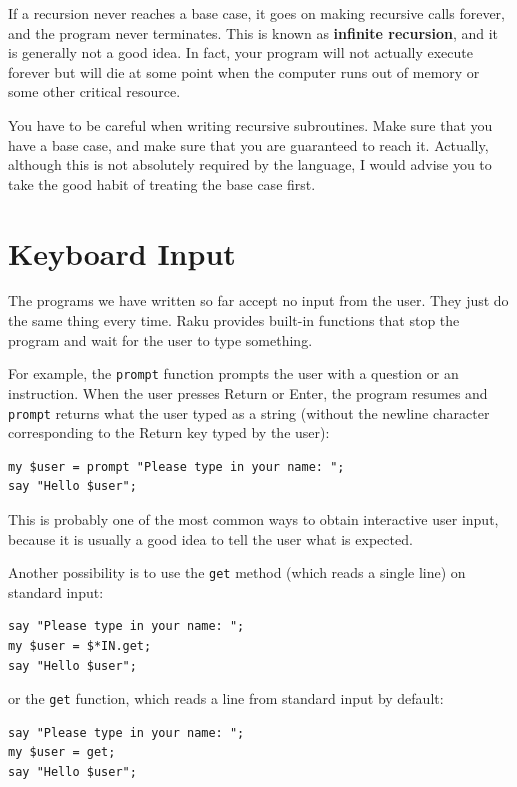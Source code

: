 If a recursion never reaches a base case, it goes on making
recursive calls forever, and the program never terminates.  This is
known as {\bf infinite recursion}, and it is generally not
a good idea. In fact, your program will not actually execute 
forever but will die at some point when the computer runs out of 
memory or some other critical resource.

You have to be careful when writing recursive subroutines. 
Make sure that you have a base case, and make sure that 
you are guaranteed to reach it. Actually, although this is not 
absolutely required by the language, I would advise you to 
take the good habit of treating the base case first.


\section{Keyboard Input}

The programs we have written so far accept no input from 
the user. They just do the same thing every time. Raku 
provides built-in functions that stop the program and
wait for the user to type something. 

For example, the {\tt prompt} function prompts the user with 
a question or an instruction. When the user presses 
{\sf Return} or {\sf Enter}, the program resumes and 
\verb"prompt" returns what the user typed as a string 
(without the newline character corresponding to the 
{\sf Return} key typed by the user):

\begin{verbatim}
my $user = prompt "Please type in your name: ";
say "Hello $user";
\end{verbatim}
%

This is probably one of the most common ways to obtain 
interactive user input, because it is usually a good idea 
to tell the user what is expected.

Another possibility is to use the {\tt get} method (which
 reads a single line) on standard input:

\begin{verbatim}
say "Please type in your name: ";
my $user = $*IN.get;
say "Hello $user";
\end{verbatim}
%
or the {\tt get} function, which reads a line from standard 
input by default:
\begin{verbatim}
say "Please type in your name: ";
my $user = get;
say "Hello $user";
\end{verbatim}
%

